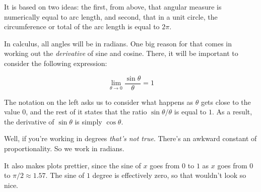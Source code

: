 \documentclass[11pt, oneside]{article}
\begin{document}
It is based on two ideas:  the first, from above, that angular measure is numerically equal to arc length, and second, that in a unit circle, the circumference or total of the arc length is equal to $2 \pi$.

In calculus, all angles will be in radians.  One big reason for that comes in working out the \emph{derivative} of sine and cosine.  There, it will be important to consider the following expression:

\[ \lim_{\theta \rightarrow 0} \frac{\sin \theta}{\theta} = 1 \]

The notation on the left asks us to consider what happens as $\theta$ gets close to the value $0$, and the rest of it states that the ratio $\sin \theta/\theta$ is equal to $1$.  As a result, the derivative of $\sin \theta$ is simply $\cos \theta$.

Well, if you're working in degrees \emph{that's not true}.  There's an awkward constant of proportionality.  So we work in radians.  

It also makes plots prettier, since the sine of $x$ goes from $0$ to $1$ as $x$ goes from $0$ to $\pi/2 \approx 1.57$.  The sine of $1$ degree is effectively zero, so that wouldn't look so nice.
\end{document}

